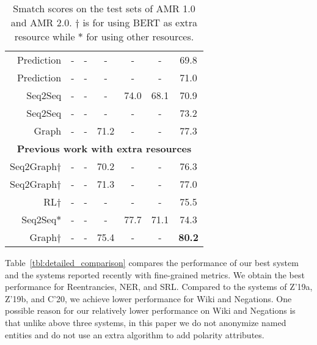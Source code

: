 \documentclass[11pt,a4paper]{article}
\begin{document}
\begin{table*}[]
\begin{tabular}{l|r|l|ccc|ccc}
        \multicolumn{3}{r|}{Prediction\small{\citep{guo_lu_emnlp_2018}}} & - & - & - & - & - & 69.8\\
        \multicolumn{3}{r|}{Prediction\small{\citep{groschwitz_etal_acl_2018}}} & - & - & - & - & - & 71.0\\
        \multicolumn{3}{r|}{Seq2Seq\small{\citep{ge_etal_ijcai_2019}}} & - & - & - & 74.0 & 68.1  & 70.9\\
        \multicolumn{3}{r|}{Seq2Seq\small{\citep{cai_lam_emnlp_2019}}} & - & - & - & - & -  & 73.2\\
        \multicolumn{3}{r|}{Graph\small{\citep{cai_lam_acl_2020}}} & - & - & 71.2 & - & -  & 77.3\\
        \hline
        \hline
        \multicolumn{9}{c}{\bf Previous work with extra resources}\\
        \hline
        \multicolumn{3}{r|}{Seq2Graph\small{\citep{zhang_etal_acl_2019}}$\dagger$} & - & - & 70.2 & - & - & 76.3\\
        \multicolumn{3}{r|}{Seq2Graph\small{\citep{zhang_etal_emnlp_2019}}$\dagger$} & - & - & 71.3 & - & - & 77.0\\
        \multicolumn{3}{r|}{RL\small{\citep{naseem_etal_acl_2019}}$\dagger$} & - & - & - & - & - & 75.5\\
        \multicolumn{3}{r|}{Seq2Seq\small{\citep{ge_etal_ijcai_2019}}$\ast$} & - & - & - & 77.7 & 71.1  & 74.3\\
        \multicolumn{3}{r|}{Graph\small{\citep{cai_lam_acl_2020}}$\dagger$} & - & - & 75.4 & - & -  & \bf 80.2\\
        \hline
    \end{tabular}
    \caption{Smatch scores on the test sets of AMR 1.0 and AMR 2.0. $\dagger$ is for using BERT as extra resource while $\ast$ for using other resources.}
    \label{tbl:performance}
\end{table*}

Table~\ref{tbl:detailed_comparison} compares the performance of our best system and the systems reported recently with fine-grained metrics. We obtain the best performance for Reentrancies, NER, and SRL. Compared to the systems of Z'19a, Z'19b, and C'20, we achieve lower performance for Wiki and Negations. One possible reason for our relatively lower performance on Wiki and Negations is that unlike above three systems, in this paper we do not anonymize named entities and do not use an extra algorithm to add polarity attributes.
\end{document}
